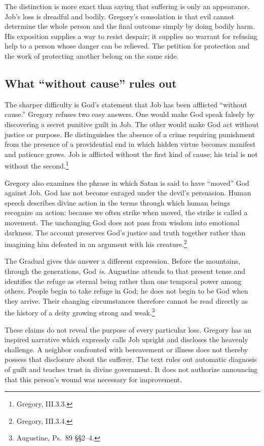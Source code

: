 The distinction is more exact than saying that suffering is only an
appearance. Job's loss is dreadful and bodily. Gregory's consolation
is that evil cannot determine the whole person and the final outcome
simply by doing bodily harm. His exposition supplies a way to resist
despair; it supplies no warrant for refusing help to a person whose
danger can be relieved. The petition for protection and the work of
protecting another belong on the same side.

\subsection{What ``without cause'' rules out}
The sharper difficulty is God's statement that Job has been afflicted
``without cause.'' Gregory refuses two easy answers. One would make
God speak falsely by discovering a secret punitive guilt in Job. The
other would make God act without justice or purpose. He distinguishes
the absence of a crime requiring punishment from the presence of a
providential end in which hidden virtue becomes manifest and patience
grows. Job is afflicted without the first kind of cause; his trial
is not without the second.\footnote{Gregory,  III.3.3.}

Gregory also examines the phrase in which Satan is said to have
``moved'' God against Job. God has not become enraged under the devil's
persuasion. Human speech describes divine action in the terms through
which human beings recognize an action: because we often strike when
moved, the strike is called a movement. The unchanging God does not
pass from wisdom into emotional darkness. The account preserves
God's justice and truth together rather than imagining him defeated
in an argument with his creature.\footnote{Gregory,
 III.3.4.}

The Gradual gives this answer a different expression. Before the
mountains, through the generations, God \emph{is}. Augustine attends
to that present tense and identifies the refuge as eternal being
rather than one temporal power among others. People begin to take
refuge in God; he does not begin to be God when they arrive. Their
changing circumstances therefore cannot be read directly as the
history of a deity growing strong and weak.\footnote{Augustine,
Ps.~89 \S\S2--4.}

These claims do not reveal the purpose of every particular loss.
Gregory has an inspired narrative which expressly calls Job upright
and discloses the heavenly challenge. A neighbor confronted with
bereavement or illness does not thereby possess that disclosure about
the sufferer. The text rules out automatic diagnosis of guilt and
teaches trust in divine government. It does not authorize announcing
that this person's wound was necessary for improvement.

